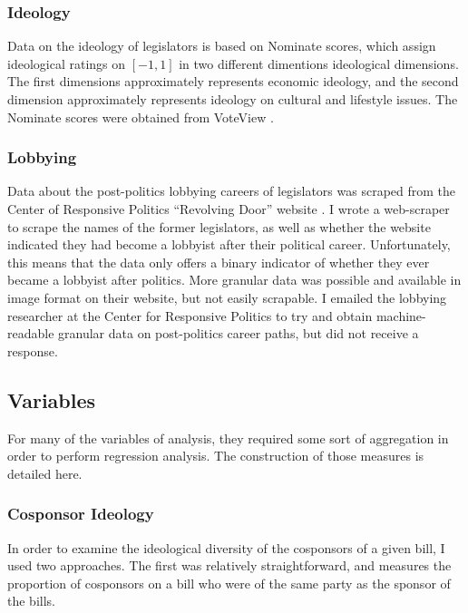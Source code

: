\documentclass{article}
\begin{document}
\subsubsection{Ideology}
Data on the ideology of legislators is based on Nominate scores, which assign ideological ratings on $[-1 , 1]$ in two different dimentions ideological dimensions. The first dimensions approximately represents economic ideology, and the second dimension approximately represents ideology on cultural and lifestyle issues. The Nominate scores were obtained from VoteView \cite{nominate}.

\subsubsection{Lobbying}
Data about the post-politics lobbying careers of legislators was scraped from the Center of Responsive Politics ``Revolving Door'' website \cite{revolving-door}. I wrote a web-scraper to scrape the names of the former legislators, as well as whether the website indicated they had become a lobbyist after their political career. Unfortunately, this means that the data only offers a binary indicator of whether they ever became a lobbyist after politics. More granular data was possible and available in image format on their website, but not easily scrapable. I emailed the lobbying researcher at the Center for Responsive Politics to try and obtain machine-readable granular data on post-politics career paths, but did not receive a response. 

\subsection{Variables}
For many of the variables of analysis, they required some sort of aggregation in order to perform regression analysis. The construction of those measures is detailed here. 

\subsubsection{Cosponsor Ideology}
In order to examine the ideological diversity of the cosponsors of a given bill, I used two approaches. The first was relatively straightforward, and measures the proportion of cosponsors on a bill who were of the same party as the sponsor of the bills. 
\end{document}
